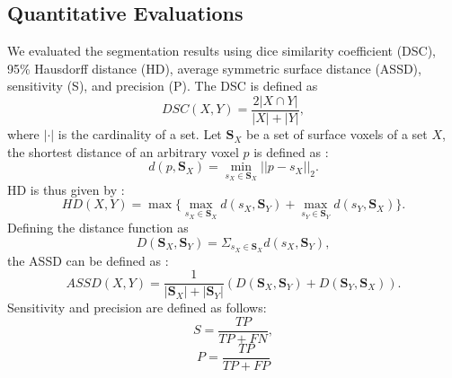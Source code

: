 \documentclass[journal]{IEEEtran}
\begin{document}
\subsection{Quantitative Evaluations}


We evaluated the segmentation results using dice similarity coefficient (DSC), 95\% Hausdorff distance (HD), average symmetric surface distance (ASSD), sensitivity (S), and precision (P). The DSC is defined as
\begin{equation}
    DSC(X,Y)=\frac{2|X \cap Y|}{|X|+|Y|},
\end{equation}
\noindent
where \(|\cdot|\) is the cardinality of a set. Let \(\textbf{S}_X\) be a set of surface voxels of a set \(X\), the shortest distance of an arbitrary voxel \(p\) is defined as \cite{heimann2009comparison}:
\begin{equation}
    d(p, \textbf{S}_X)=\min_{s_X \in \textbf{S}_X}{||p-s_X||}_2.
\label{eq:d}
\end{equation}
\noindent
HD is thus given by \cite{heimann2009comparison}:
\begin{equation}
    HD(X,Y)=\max\{\max_{s_X \in \textbf{S}_X}{d(s_X, \textbf{S}_Y)}+\max_{s_Y \in \textbf{S}_Y}{d(s_Y, \textbf{S}_X)}\}.
\label{eq:hd}
\end{equation}
\noindent
Defining the distance function as
\begin{equation}
    D(\textbf{S}_X, \textbf{S}_Y)=\Sigma_{s_X \in \textbf{S}_X} d(s_X, \textbf{S}_Y),
\end{equation}
the ASSD can be defined as \cite{heimann2009comparison}:
\begin{equation}
    ASSD(X,Y)=\frac{1}{|\textbf{S}_X|+|\textbf{S}_Y|}(D(\textbf{S}_X, \textbf{S}_Y)+D(\textbf{S}_Y, \textbf{S}_X)).
\end{equation}
Sensitivity and precision are defined as follows:
\begin{equation}
    S=\frac{TP}{TP+FN},
\label{eq:sensitivity}
\end{equation}
\begin{equation}
    P=\frac{TP}{TP+FP}
\label{eq:precision}
\end{equation}
\end{document}
